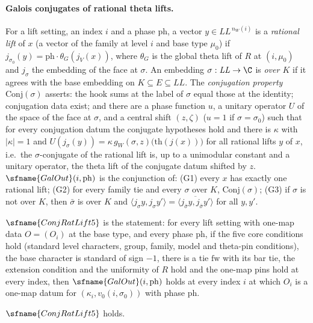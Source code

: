 \paragraph{Galois conjugates of rational theta lifts.}
For a lift setting, an index $i$ and a phase $\mathrm{ph}$, a vector $y\in\mathit{LL}^{\,n_W(i)}$ is a \emph{rational lift} of $x$ (a vector
of the family at level $i$ and base type $\mu_0$) if $j_{\sigma_0}(y)=\mathrm{ph}\cdot\theta_G(j_V(x))$, where $\theta_G$ is the global theta
lift of $R$ at $(i,\mu_0)$ and $j_\sigma$ the embedding of the face at $\sigma$. An embedding $\sigma:\mathit{LL}\to\C$ is \emph{over $K$} if
it agrees with the base embedding on $K\subseteq E\subseteq\mathit{LL}$. The \emph{conjugation property} $\mathrm{Conj}(\sigma)$ asserts:
the hook sums at the label of $\sigma$ equal those at the identity; conjugation data exist; and there are a phase function $u$, a
unitary operator $U$ of the space of the face at $\sigma$, and a central shift $(z,\zeta)$ ($u=1$ if $\sigma=\sigma_0$) such that for every
conjugation datum the conjugate hypotheses hold and there is $\kappa$ with $|\kappa|=1$ and
$U(j_\sigma(y))=\kappa\,g_W(\sigma,z)\bigl(\mathrm{th}(j(x))\bigr)$ for all rational lifts $y$ of $x$, i.e.\ the $\sigma$-conjugate of the
rational lift is, up to a unimodular constant and a unitary operator, the theta lift of the conjugate datum shifted by $z$.
$\sfname{GalOut}(i,\mathrm{ph})$ is the conjunction of: (G1) every $x$ has exactly one rational lift; (G2) for every family tie and
every $\sigma$ over $K$, $\mathrm{Conj}(\sigma)$; (G3) if $\sigma$ is not over $K$, then $\bar\sigma$ is over $K$ and
$\langle j_\sigma y,j_\sigma y'\rangle=\overline{\langle j_{\bar\sigma}y,j_{\bar\sigma}y'\rangle}$ for all $y,y'$.

$\sfname{ConjRatLift5}$ is the statement: for every lift setting with one-map data $O=(O_i)$ at the base type, and every phase
$\mathrm{ph}$, if the five core conditions hold (standard level characters, group, family, model and theta-pin conditions), the base
character is standard of sign $-1$, there is a tie $\mathrm{fw}$ with its bar tie, the extension condition and the uniformity of $R$
hold and the one-map pins hold at every index, then $\sfname{GalOut}(i,\mathrm{ph})$ holds at every index $i$ at which $O_i$ is a
one-map datum for $(\kappa_i,v_0(i,\sigma_0))$ with phase $\mathrm{ph}$.

\begin{theorem}\label{pf:sh-div:conj}
$\sfname{ConjRatLift5}$ holds.
\end{theorem}

